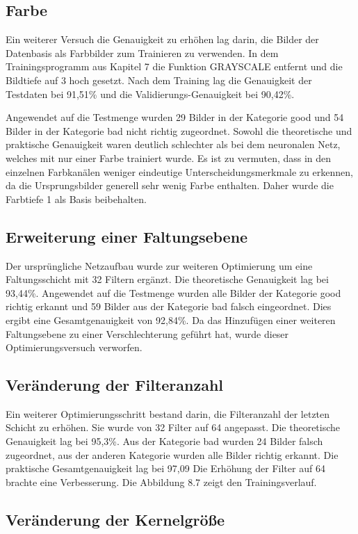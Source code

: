 \subsection{Farbe}
Ein weiterer Versuch die Genauigkeit zu erhöhen lag darin, die Bilder der Datenbasis
als Farbbilder zum Trainieren zu verwenden. In dem Trainingsprogramm aus Kapitel
7 die Funktion GRAYSCALE entfernt und die Bildtiefe auf 3 hoch gesetzt. Nach dem
Training lag die Genauigkeit der Testdaten bei 91,51\% und die Validierungs-Genauigkeit
bei 90,42\%.

Angewendet auf die Testmenge wurden 29 Bilder in der Kategorie good und 54 Bilder
in der Kategorie bad nicht richtig zugeordnet. Sowohl die theoretische und praktische
Genauigkeit waren deutlich schlechter als bei dem neuronalen Netz, welches mit nur einer
Farbe trainiert wurde. Es ist zu vermuten, dass in den einzelnen Farbkanälen weniger
eindeutige Unterscheidungsmerkmale zu erkennen, da die Ursprungsbilder generell sehr
wenig Farbe enthalten. Daher wurde die Farbtiefe 1 als Basis beibehalten.

\subsection{Erweiterung einer Faltungsebene}
Der ursprüngliche Netzaufbau wurde zur weiteren Optimierung um eine Faltungsschicht
mit 32 Filtern ergänzt. Die theoretische Genauigkeit lag bei 93,44\%. Angewendet auf die
Testmenge wurden alle Bilder der Kategorie good richtig erkannt und 59 Bilder aus der
Kategorie bad falsch eingeordnet. Dies ergibt eine Gesamtgenauigkeit von 92,84\%. Da das
Hinzufügen einer weiteren Faltungsebene zu einer Verschlechterung geführt hat, wurde
dieser Optimierungsversuch verworfen.

\subsection{Veränderung der Filteranzahl}

Ein weiterer Optimierungsschritt bestand darin, die Filteranzahl der letzten Schicht zu
erhöhen. Sie wurde von 32 Filter auf 64 angepasst. Die theoretische Genauigkeit lag bei
95,3\%. Aus der Kategorie bad wurden 24 Bilder falsch zugeordnet, aus der anderen 
Kategorie wurden alle Bilder richtig erkannt. Die praktische Gesamtgenauigkeit lag bei 97,09%
Die Erhöhung der Filter auf 64 brachte eine Verbesserung. Die Abbildung 8.7 zeigt den
Trainingsverlauf.

\subsection{Veränderung der Kernelgröße}

